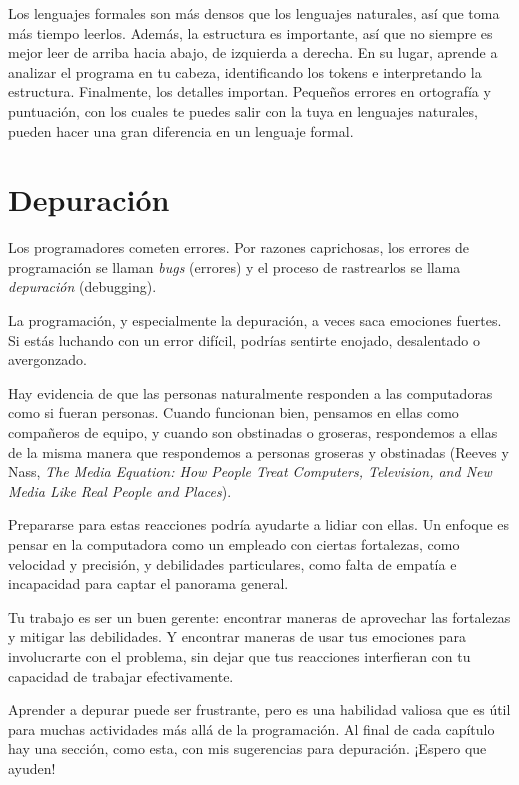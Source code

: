 Los lenguajes formales son más densos que los lenguajes naturales, así que toma más tiempo leerlos. Además, la estructura es importante, así que no siempre es mejor leer de arriba hacia abajo, de izquierda a derecha. En su lugar, aprende a analizar el programa en tu cabeza, identificando los tokens e interpretando la estructura. Finalmente, los detalles importan. Pequeños errores en ortografía y puntuación, con los cuales te puedes salir con la tuya en lenguajes naturales, pueden hacer una gran diferencia en un lenguaje formal.

\section{Depuración}

Los programadores cometen errores. Por razones caprichosas, los errores de programación se llaman \textit{bugs} (errores) y el proceso de rastrearlos se llama \textit{depuración} (debugging).

La programación, y especialmente la depuración, a veces saca emociones fuertes. Si estás luchando con un error difícil, podrías sentirte enojado, desalentado o avergonzado.

Hay evidencia de que las personas naturalmente responden a las computadoras como si fueran personas. Cuando funcionan bien, pensamos en ellas como compañeros de equipo, y cuando son obstinadas o groseras, respondemos a ellas de la misma manera que respondemos a personas groseras y obstinadas (Reeves y Nass, \textit{The Media Equation: How People Treat Computers, Television, and New Media Like Real People and Places}).

Prepararse para estas reacciones podría ayudarte a lidiar con ellas. Un enfoque es pensar en la computadora como un empleado con ciertas fortalezas, como velocidad y precisión, y debilidades particulares, como falta de empatía e incapacidad para captar el panorama general. 

Tu trabajo es ser un buen gerente: encontrar maneras de aprovechar las fortalezas y mitigar las debilidades. Y encontrar maneras de usar tus emociones para involucrarte con el problema, sin dejar que tus reacciones interfieran con tu capacidad de trabajar efectivamente.

Aprender a depurar puede ser frustrante, pero es una habilidad valiosa que es útil para muchas actividades más allá de la programación. Al final de cada capítulo hay una sección, como esta, con mis sugerencias para depuración. ¡Espero que ayuden!

